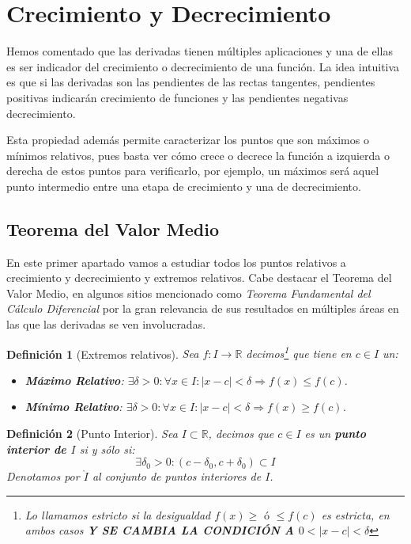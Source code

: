 \documentclass[10pt,a4paper,openright]{book}
\theoremstyle{break}
\newtheorem*{defi}{Definición}
\begin{document}
\section{Crecimiento y Decrecimiento}
Hemos comentado que las derivadas tienen múltiples aplicaciones y una de ellas es ser indicador del crecimiento o decrecimiento de una función. La idea intuitiva es que si las derivadas son las pendientes de las rectas tangentes, pendientes positivas indicarán crecimiento de funciones y las pendientes negativas decrecimiento.

Esta propiedad además permite caracterizar los puntos que son máximos o mínimos relativos, pues basta ver cómo crece o decrece la función a izquierda o derecha de estos puntos para verificarlo, por ejemplo, un máximos será aquel punto intermedio entre una etapa de crecimiento y una de decrecimiento.

\subsection{Teorema del Valor Medio}
En este primer apartado vamos a estudiar todos los puntos relativos a crecimiento y decrecimiento y extremos relativos. Cabe destacar el Teorema del Valor Medio, en algunos sitios mencionado como \textit{Teorema Fundamental del Cálculo Diferencial} por la gran relevancia de sus resultados en múltiples áreas en las que las derivadas se ven involucradas.

\begin{defi}[Extremos relativos]
Sea $f:I\rightarrow \mathbb R$ decimos\footnote{Lo llamamos estricto si la desigualdad $f(x)\geq \mbox{ ó }\leq f(c)$ es estricta, en ambos casos \textbf{Y SE CAMBIA LA CONDICIÓN A $0<|x-c|<\delta$}} que tiene en $c\in I$ un:
\begin{itemize}
\item \textbf{Máximo Relativo}: $\exists \delta>0: \forall x \in I: |x-c|<\delta \Rightarrow f(x)\leq f(c)$.
\item \textbf{Mínimo Relativo}: $\exists \delta>0: \forall x \in I: |x-c|<\delta \Rightarrow f(x)\geq f(c)$.
\end{itemize}
\end{defi}

\begin{defi}[Punto Interior]
Sea $I\subset\mathbb{R}$, decimos que $c\in I$ es un \textbf{punto interior de $I$} si y sólo si:
$$\exists \delta_0 >0: (c-\delta_0, c+\delta_0)\subset I$$
Denotamos por $\mathring{I}$ al conjunto de puntos interiores de $I$.
\end{defi}
\end{document}
